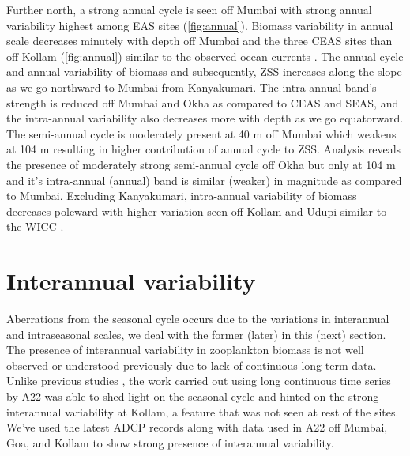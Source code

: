 \documentclass[authoryear,review,12pt]{elsarticle}
\begin{document}
    Further north, a strong annual cycle is seen off Mumbai with strong annual variability highest among EAS sites (\cref{fig:annual}). Biomass variability in annual scale decreases minutely with depth off Mumbai and the three CEAS sites than off Kollam (\cref{fig:annual}) similar to the observed ocean currents \citep{chaudhuri2020observed,chaudhuri2021observed}. The annual cycle and annual variability of biomass and subsequently, ZSS increases along the slope as we go northward to Mumbai from Kanyakumari. The intra-annual band's strength is reduced off Mumbai and Okha as compared to CEAS and SEAS, and the intra-annual variability also decreases more with depth as we go equatorward. The semi-annual cycle is moderately present at 40 m off Mumbai which weakens at 104 m resulting in higher contribution of annual cycle to ZSS. Analysis reveals the presence of moderately strong semi-annual cycle off Okha but only at 104 m and it's intra-annual (annual) band is similar (weaker) in magnitude as compared to Mumbai. Excluding Kanyakumari, intra-annual variability of biomass decreases  poleward with higher variation seen off Kollam and Udupi similar to the WICC \citep{amol2014observed,chaudhuri2020observed}.	

	
	\section{Interannual variability}
	Aberrations from the seasonal cycle occurs due to the variations in interannual and intraseasonal scales, we deal with the former (later) in this (next) section. The presence of interannual variability in zooplankton biomass is not well observed or understood previously due to lack of continuous long-term data. Unlike previous studies \citep{madhupratap1996lack, jyothibabu2010re}, the work carried out using long continuous time series  by A22 was able to shed light on the seasonal cycle and hinted on the strong interannual variability at Kollam, a feature that was not seen at rest of the sites. We've used the latest ADCP records along with data used in A22 off Mumbai, Goa, and Kollam to show strong presence of interannual variability.
	
\end{document}
